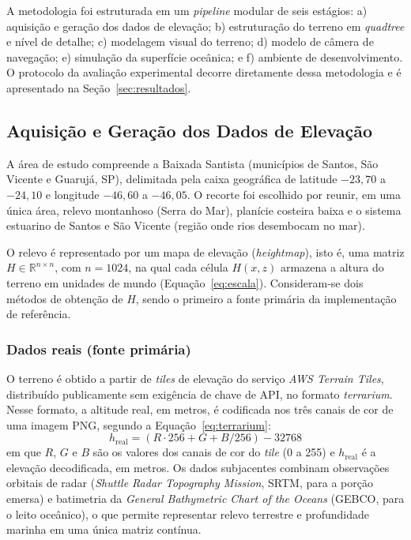 \documentclass[conference]{IEEEtran}
\begin{document}
A metodologia foi estruturada em um \emph{pipeline} modular de seis
estágios: a) aquisição e geração dos dados de elevação; b) estruturação do
terreno em \emph{quadtree} e nível de detalhe; c) modelagem visual do
terreno; d) modelo de câmera de navegação; e) simulação da superfície
oceânica; e f) ambiente de desenvolvimento. O protocolo da avaliação experimental decorre
diretamente dessa metodologia e é apresentado na
Seção~\ref{sec:resultados}.

\subsection{Aquisição e Geração dos Dados de Elevação}
\label{sub:aquisicao}

A área de estudo compreende a Baixada Santista (municípios de Santos, São
Vicente e Guarujá, SP), delimitada pela caixa geográfica de latitude
$-23{,}70$ a $-24{,}10$ e longitude $-46{,}60$ a $-46{,}05$. O recorte foi
escolhido por reunir, em uma única área, relevo montanhoso (Serra do Mar),
planície costeira baixa e o sistema estuarino de Santos e São Vicente
(região onde rios desembocam no mar).

O relevo é representado por um mapa de elevação (\emph{heightmap}), isto é,
uma matriz $H \in \mathbb{R}^{n \times n}$, com $n = 1024$, na qual cada
célula $H(x,z)$ armazena a altura do terreno em unidades de mundo
(Equação~\eqref{eq:escala}). Consideram-se dois métodos
de obtenção de $H$, sendo o primeiro a fonte primária da implementação de
referência.

\subsubsection{Dados reais (fonte primária)}
O terreno é obtido a partir de \emph{tiles} de elevação do serviço
\emph{AWS Terrain Tiles}, distribuído publicamente sem exigência de chave
de API, no formato \emph{terrarium}. Nesse formato, a altitude real, em
metros, é codificada nos três canais de cor de uma imagem PNG, segundo a
Equação~\eqref{eq:terrarium}:
\begin{equation}
h_{\text{real}} = (R \cdot 256 + G + B/256) - 32768
\label{eq:terrarium}
\end{equation}
em que $R$, $G$ e $B$ são os valores dos canais de cor do \emph{tile}
(0 a 255) e $h_{\text{real}}$ é a elevação decodificada, em metros. Os dados
subjacentes combinam observações orbitais de radar (\emph{Shuttle Radar Topography
Mission}, SRTM, para a porção emersa) e batimetria da \emph{General
Bathymetric Chart of the Oceans} (GEBCO, para o leito oceânico), o que permite
representar relevo terrestre e profundidade marinha em uma única matriz
contínua.
\end{document}

